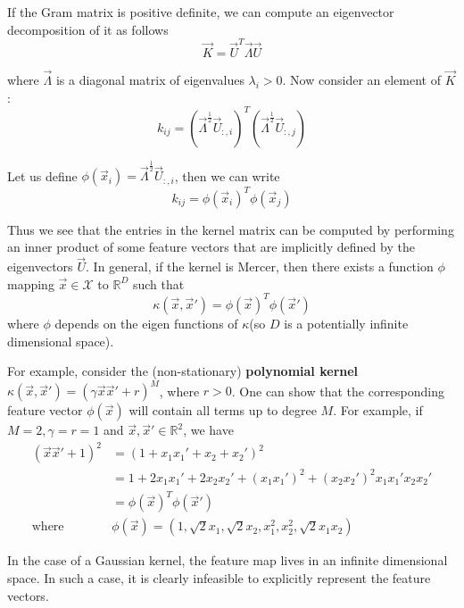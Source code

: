 If the Gram matrix is positive definite, we can compute an eigenvector decomposition of it as follows
\begin{equation}
\vec{K}=\vec{U}^T\vec{\Lambda}\vec{U}
\end{equation}

where $\vec{\Lambda}$ is a diagonal matrix of eigenvalues $\lambda_i >0$. Now consider an element of $\vec{K}$:
\begin{equation}
k_{ij}=(\vec{\Lambda}^{\frac{1}{2}}\vec{U}_{:,i})^T(\vec{\Lambda}^{\frac{1}{2}}\vec{U}_{:,j})
\end{equation}

Let us define $\phi(\vec{x}_i)=\vec{\Lambda}^{\frac{1}{2}}\vec{U}_{:,i}$, then we can write
\begin{equation}
k_{ij}=\phi(\vec{x}_i)^T\phi(\vec{x}_j)
\end{equation}

Thus we see that the entries in the kernel matrix can be computed by performing an inner product of some feature vectors that are implicitly defined by the eigenvectors $\vec{U}$. In general, if the kernel is Mercer, then there exists a function $\phi$ mapping $\vec{x} \in \mathcal{X}$ to $\mathbb{R}^D$ such that
\begin{equation}
\kappa(\vec{x},\vec{x}')=\phi(\vec{x})^T\phi(\vec{x}')
\end{equation}
where $\phi$ depends on the eigen functions of $\kappa$(so $D$ is a potentially infinite dimensional space).

For example, consider the (non-stationary) \textbf{polynomial kernel} $\kappa(\vec{x},\vec{x}')=(\gamma \vec{x}\vec{x}'+r)^M$, where $r>0$. One can show that the corresponding feature vector $\phi(\vec{x})$ will contain all terms up to degree $M$. For example, if $M=2, \gamma=r=1$ and $\vec{x}, \vec{x}' \in \mathbb{R}^2$, we have
\begin{align*}
(\vec{x}\vec{x}'+1)^2 & =(1+x_1x_1'+x_2+x_2')^2 \\
    & = 1+2x_1x_1'+2x_2x_2'+(x_1x_1')^2+(x_2x_2')^2x_1x_1'x_2x_2' \\
	& = \phi(\vec{x})^T\phi(\vec{x}') \\
\text{where } & \phi(\vec{x})=(1,\sqrt{2}x_1,\sqrt{2}x_2,x_1^2,x_2^2,\sqrt{2}x_1x_2)
\end{align*}

In the case of a Gaussian kernel, the feature map lives in an infinite dimensional space. In such a case, it is clearly infeasible to explicitly represent the feature vectors.

